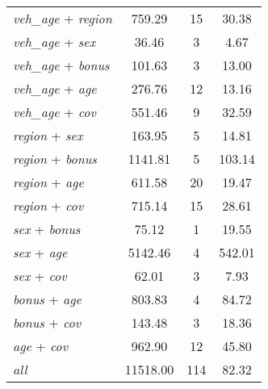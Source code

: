 {\begin{ThreePartTable}
\begin{longtable}{lccc}
    \textit{veh\_age} + \textit{region} &   759.29 &       15 &    30.38 \\
    \textit{veh\_age} + \textit{sex} &    36.46 &        3 &     4.67 \\
    \textit{veh\_age} + \textit{bonus} &   101.63 &        3 &    13.00 \\
    \textit{veh\_age} + \textit{age} &   276.76 &       12 &    13.16 \\
    \textit{veh\_age} + \textit{cov} &   551.46 &        9 &    32.59 \\
    \textit{region} + \textit{sex} &   163.95 &        5 &    14.81 \\
    \textit{region} + \textit{bonus} &  1141.81 &        5 &   103.14 \\
    \textit{region} + \textit{age} &   611.58 &       20 &    19.47 \\
    \textit{region} + \textit{cov} &   715.14 &       15 &    28.61 \\
    \textit{sex} + \textit{bonus} &    75.12 &        1 &    19.55 \\
    \textit{sex} + \textit{age} &  5142.46 &        4 &   542.01 \\
    \textit{sex} + \textit{cov} &    62.01 &        3 &     7.93 \\
    \textit{bonus} + \textit{age} &   803.83 &        4 &    84.72 \\
    \textit{bonus} + \textit{cov} &   143.48 &        3 &    18.36 \\
    \textit{age} + \textit{cov} &   962.90 &       12 &    45.80 \\
    \textit{all}\tnote{\ddag} & 11518.00 &      114 &    82.32 \\

\end{longtable}
\end{ThreePartTable}
}
